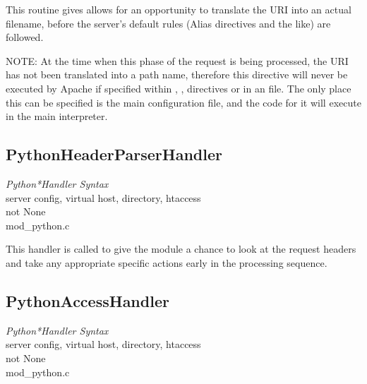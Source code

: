 This routine gives allows for an opportunity to translate the URI into
an actual filename, before the server's default rules (Alias
directives and the like) are followed.

NOTE: At the time when this phase of the request is being processed,
the URI has not been translated into a path name, therefore this
directive will never be executed by Apache if specified within
, ,  directives or in
an  file. The only place this can be specified is the
main configuration file, and the code for it will execute in the
main interpreter.

\subsection{PythonHeaderParserHandler\label{dir-handlers-hph}}

\emph{Python*Handler Syntax}\\
server config, virtual host, directory, htaccess\\
not None\\
mod_python.c

This handler is called to give the module a chance to look at the
request headers and take any appropriate specific actions early in the
processing sequence.

\subsection{PythonAccessHandler\label{dir-handlers-ach}}

\emph{Python*Handler Syntax}\\
server config, virtual host, directory, htaccess\\
not None\\
mod_python.c

